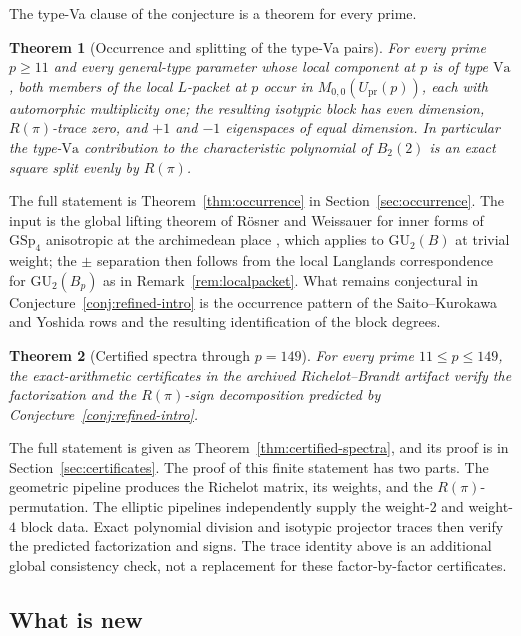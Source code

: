 \documentclass[11pt]{amsart}
\theoremstyle{plain}
\newtheorem{theorem}{Theorem}[section]
\theoremstyle{definition}
\newcommand{\GU}{\mathrm{GU}}
\newcommand{\GSp}{\mathrm{GSp}}
\newcommand{\Upr}{U_{\mathrm{pr}}}
\newcommand{\Va}{\mathrm{Va}}
\providecommand{\Upr}{U_{\mathrm{pr}}}
\providecommand{\Va}{\mathrm{Va}}
\begin{document}
	The type-Va clause of the conjecture is a theorem for every prime.
	
	\begin{theorem}[Occurrence and splitting of the type-Va pairs]\label{thm:occurrence-intro}
		For every prime $p\ge11$ and every general-type parameter whose local
		component at $p$ is of type $\Va$, both members of the local
		$L$-packet at $p$ occur in $M_{0,0}(\Upr(p))$, each with automorphic
		multiplicity one; the resulting isotypic block has even dimension,
		$R(\pi)$-trace zero, and $+1$ and $-1$ eigenspaces of equal
		dimension. In particular the type-$\Va$ contribution to the
		characteristic polynomial of $B_2(2)$ is an exact square split
		evenly by $R(\pi)$.
	\end{theorem}
	The full statement is Theorem~\ref{thm:occurrence} in
	Section~\ref{sec:occurrence}. The input is the global lifting theorem of
	R\"osner and Weissauer for inner forms of $\GSp_4$ anisotropic at the
	archimedean place \cite[Thm.~11.4]{RoesnerWeissauer2021}, which applies to
	$\GU_2(B)$ at trivial weight; the $\pm$ separation then follows from the
	local Langlands correspondence for $\GU_2(B_p)$ as in
	Remark~\ref{rem:localpacket}. What remains conjectural in
	Conjecture~\ref{conj:refined-intro} is the occurrence pattern of the
	Saito--Kurokawa and Yoshida rows and the resulting identification of the
	block degrees.
	
	
	\begin{theorem}[Certified spectra through $p=149$]\label{thm:certified-intro}
		For every prime $11\le p\le149$, the exact-arithmetic certificates in the
		archived Richelot--Brandt artifact verify the factorization and the
		$R(\pi)$-sign decomposition predicted by
		Conjecture~\ref{conj:refined-intro}.
	\end{theorem}
	
	The full statement is given as Theorem~\ref{thm:certified-spectra}, and its proof is in Section~\ref{sec:certificates}. The proof of this finite statement has two parts. The geometric pipeline produces the Richelot matrix, its weights, and the $R(\pi)$-permutation.
	The elliptic pipelines independently supply the weight-$2$ and weight-$4$
	block data. Exact polynomial division and isotypic projector traces then
	verify the predicted factorization and signs. The trace identity above is
	an additional global consistency check, not a replacement for these
	factor-by-factor certificates.
	
	\subsection{What is new}\label{ss:what-is-new}
	
\end{document}
